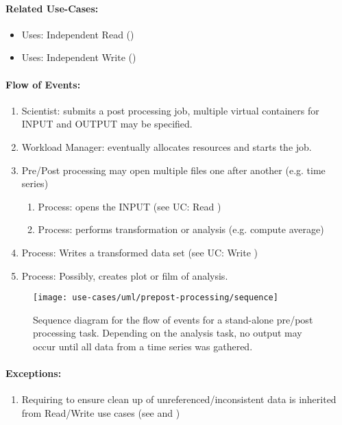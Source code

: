 \paragraph{Related Use-Cases:}
\begin{itemize}
	\item Uses: Independent Read ()
	\item Uses: Independent Write ()
\end{itemize}


\paragraph{Flow of Events:}
\begin{enumerate}
	\item Scientist: submits a post processing job, multiple virtual containers for INPUT and OUTPUT may be specified.
	\item Workload Manager: eventually allocates resources and starts the job.
	\item Pre/Post processing may open multiple files one after another (e.g. time series)
	\begin{enumerate}
	\item Process: opens the INPUT  (see UC: Read )
	\item Process: performs transformation or analysis (e.g. compute average)
	\end{enumerate}
	\item Process: Writes a transformed data set (see UC: Write )
	\item Process: Possibly, creates plot or film of analysis.
\end{enumerate}


\begin{figure}
	\centering
	\texttt{[image: use-cases/uml/prepost-processing/sequence]}
	\caption{Sequence diagram for the flow of events for a stand-alone pre/post processing task. Depending on the analysis task, no output may occur until all data from a time series was gathered.}
	\label{fig:sequence pre + post processing}
\end{figure}



\paragraph{Exceptions:}
\begin{enumerate}
	\item  Requiring to ensure clean up of unreferenced/inconsistent data is inherited from Read/Write use cases (see  and )
\end{enumerate}




